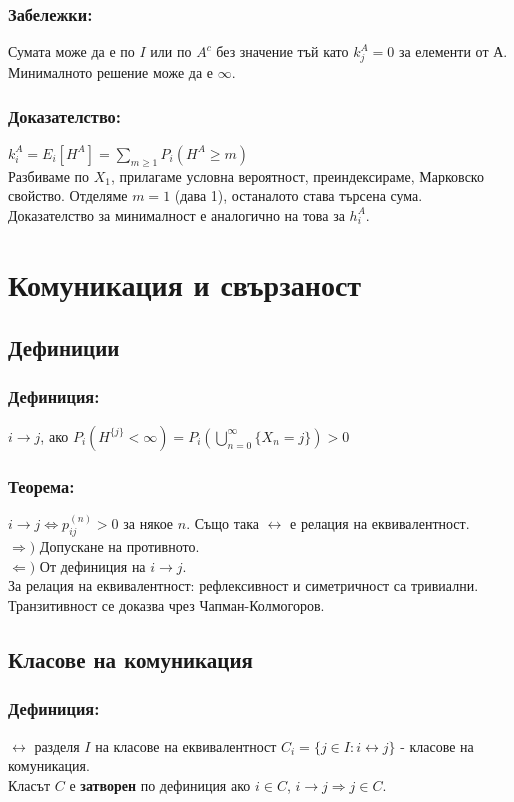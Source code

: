 \documentclass{article}
\begin{document}
\subsubsection*{Забележки:}
Сумата може да е по $I$ или по $A^c$ без значение тъй като $k_j^A=0$ за елементи от А. Минималното решение може да е $\infty$.

\subsubsection*{Доказателство:}
$k_i^A = E_i[H^A] = \sum_{m \geq 1} P_i(H^A \geq m)$ \\
Разбиваме по $X_1$, прилагаме условна вероятност, преиндексираме, Марковско свойство. 
Отделяме $m=1$ (дава 1), останалото става търсена сума. 
Доказателство за минималност е аналогично на това за $h_i^A$.

\section{Комуникация и свързаност}
\subsection{Дефиниции}
\subsubsection*{Дефиниция:}
$i \to j$, ако $P_i(H^{\{j\}} < \infty) = P_i\left(\bigcup_{n=0}^\infty \{X_n = j\}\right) > 0$

\subsubsection*{Теорема:}
$i \to j \Leftrightarrow p_{ij}^{(n)} > 0$ за някое $n$. Също така $\leftrightarrow$ е релация на еквивалентност. \\
$\Rightarrow)$ Допускане на противното. \\
$\Leftarrow)$ От дефиниция на $i \to j$. \\
За релация на еквивалентност: рефлексивност и симетричност са тривиални. Транзитивност се доказва чрез Чапман-Колмогоров.

\subsection{Класове на комуникация}
\subsubsection*{Дефиниция:}
$\leftrightarrow$ разделя $I$ на класове на еквивалентност $C_i = \{j \in I : i \leftrightarrow j\}$ - класове на комуникация. \\
Класът $C$ е \textbf{затворен} по дефиниция ако $i \in C$, $i \to j \Rightarrow j \in C$.
\end{document}
